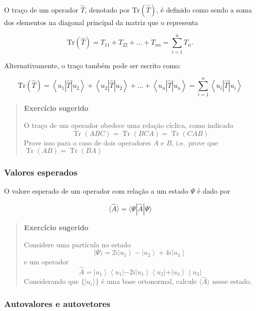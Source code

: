 \documentclass[11pt]{article}
\begin{document}
O traço de um operador \(\hat{T}\), denotado por \(\text{Tr}(\hat{T})\),
é definido como sendo a soma dos elementos na diagonal principal da
matriz que o representa

\[
\text{Tr}(\hat{T})=T_{11}+T_{22}+\ldots+T_{n n}=\sum_{i=1}^{n} T_{i i}.
\]

Alternativamente, o traço também pode ser escrito como:

\[
\text{Tr}(\hat{T})=\left\langle u_{1}|\hat{T}| u_{2}\right\rangle+\left\langle u_{2}|\hat{T}| u_{2}\right\rangle+\ldots+\left\langle u_{n}|\hat{T}| u_{n}\right\rangle=\sum_{i=1}^{n}\left\langle u_{i}|\hat{T}| u_{i}\right\rangle
\]

\begin{quote}
\textbf{Exercício sugerido}

O traço de um operador obedece uma relação cíclica, como indicado \[
\operatorname{Tr}(A B C)=\operatorname{Tr}(B C A)=\operatorname{Tr}(C A B)   
\] Prove isso para o caso de dois operadores \(A\) e \(B\), i.e.~prove
que \(\operatorname{Tr}(AB)=\operatorname{Tr}(B A)\)
\end{quote}

\hypertarget{valores-esperados}{%
\subsubsection{Valores esperados}\label{valores-esperados}}

O valore esperado de um operador com relação a um estado \(\Psi\) é dado
por

\[
\langle\hat{A}\rangle=\langle\Psi|\hat{A}| \Psi\rangle
\]

\begin{quote}
\textbf{Exercício sugerido}

Considere uma partícula no estado \[
|\Psi\rangle=2 i\left|u_{1}\right\rangle-\left|u_{2}\right\rangle+4 i\left|u_{3}\right\rangle
\] e um operador \[
\hat{A}=\left|u_{1}\right\rangle\left\langle u_{1}| -2 i| u_{1}\right\rangle\left\langle u_{2}|+| u_{3}\right\rangle\left\langle u_{3}\right|
\] Considerando que \(\{ |u_i\rangle \}\) é uma base ortonormal, calcule
\(\langle \hat{A} \rangle\) nesse estado.
\end{quote}

    \hypertarget{autovalores-e-autovetores}{%
\subsubsection{Autovalores e
autovetores}\label{autovalores-e-autovetores}}
\end{document}
